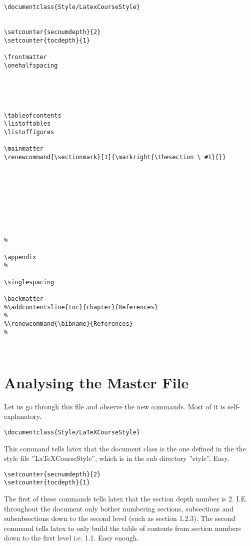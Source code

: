 \singlespacing
\pagebreak
\begin{verbatim}
\documentclass{Style/LatexCourseStyle}


\setcounter{secnumdepth}{2}
\setcounter{tocdepth}{1}

\frontmatter
\onehalfspacing





\tableofcontents
\listoftables
\listoffigures

\mainmatter
\renewcommand{\sectionmark}[1]{\markright{\thesection \ #1}{}}









%

\appendix
%

\singlespacing

\backmatter
%\addcontentsline{toc}{chapter}{References}
%
%\renewcommand{\bibname}{References}
%

  
\end{verbatim}
\onehalfspacing
\pagebreak

\section{Analysing the Master File}
Let us go through this file and observe the new commands. Most of it is self-explanatory.

\begin{verbatim}
\documentclass{Style/LaTeXCourseStyle}
\end{verbatim}

This command tells latex that the document class is the one defined in the the style file ''LaTeXCourseStyle'', which is in the sub directory ''style''.  Easy.

\begin{verbatim}
\setcounter{secnumdepth}{2}
\setcounter{tocdepth}{1}
\end{verbatim}

The first of these commands tells latex that the section depth number is 2. I.E. throughout the document only bother numbering sections, subsections and subsubsections down to the second level (such as section 1.2.3). The second command tells latex to only build the table of contents from section numbers down to the first level i.e. 1.1.  Easy enough.


